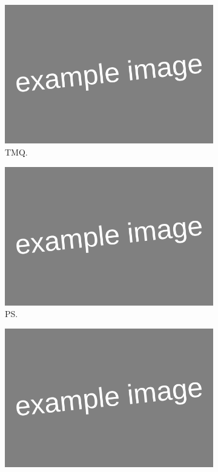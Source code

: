 \begin{figure}[htbp!] 
	\centering
	\begin{subfigure}[b]{0.45\textwidth}
		\includegraphics[width=\textwidth]{Example_image}
		\caption{TMQ.}
		\label{fig:std_precip_june}   
	\end{subfigure}             
	\begin{subfigure}[b]{0.45\textwidth}
		\includegraphics[width=\textwidth]{Example_image}
		\caption{PS.}
		\label{fig:std_pressure_temp}
	\end{subfigure}             
	\hfill
		\begin{subfigure}[b]{0.45\textwidth}
		\includegraphics[width=\textwidth]{Example_image}

\end{subfigure}
\end{figure}
